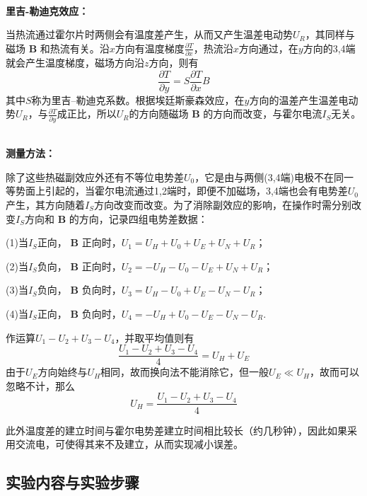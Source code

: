 \documentclass[UTF8]{article}
\theoremstyle{MyLineTheoremStyle} %
\theoremstyle{MyBlockTheoremStyle} %
\theoremstyle{MySubsubsectionStyle} %
\begin{document}
~\\
\noindent \textbf{里吉-勒迪克效应：}\par

当热流通过霍尔片时两侧会有温度差产生，从而又产生温差电动势$ U_R $，其同样与磁场 $\boldsymbol{B}$ 和热流有关。沿$ x $方向有温度梯度$ \frac{\partial T}{\partial x} $，热流沿$ x $方向通过，在$ y $方向的3,4端就会产生温度梯度，磁场方向沿$ z $方向，则有
\begin{equation}
\frac{\partial T}{\partial y}=S\frac{\partial T}{\partial x}B
\end{equation}
其中$ S $称为里吉--勒迪克系数。根据埃廷斯豪森效应，在$ y $方向的温差产生温差电动势$ U_R $，与$ \frac{\partial T}{\partial y} $成正比，所以$ U_R $的方向随磁场 $\boldsymbol{B}$ 的方向而改变，与霍尔电流$ I_S $无关。

~\\
\noindent \textbf{测量方法：}\par

除了这些热磁副效应外还有不等位电势差$ U_0 $，它是由与两侧(3,4端)电极不在同一等势面上引起的，当霍尔电流通过1,2端时，即便不加磁场，3,4端也会有电势差$ U_0 $产生，其方向随着$ I_S $方向改变而改变。为了消除副效应的影响，在操作时需分别改变$ I_S $方向和 $\boldsymbol{B}$ 的方向，记录四组电势差数据：

(1)当$ I_S $正向， $\boldsymbol{B}$ 正向时，$ U_1=U_H+U_0+U_E+U_N+U_R $；

(2)当$ I_S $负向， $\boldsymbol{B}$ 正向时，$ U_2=-U_H-U_0-U_E+U_N+U_R $；

(3)当$ I_S $负向， $\boldsymbol{B}$ 负向时，$ U_3=U_H-U_0+U_E-U_N-U_R $；

(4)当$ I_S $正向， $\boldsymbol{B}$ 负向时，$ U_4=-U_H+U_0-U_E-U_N-U_R $.

作运算$ U_1-U_2+U_3-U_4 $，并取平均值则有
\begin{equation}
\frac{U_1-U_2+U_3-U_4}{4}=U_H+U_E
\end{equation}
由于$ U_E $方向始终与$ U_H $相同，故而换向法不能消除它，但一般$ U_E\ll U_H $，故而可以忽略不计，那么
\begin{equation}
U_H=\frac{U_1-U_2+U_3-U_4}{4}
\end{equation}

此外温度差的建立时间与霍尔电势差建立时间相比较长（约几秒钟），因此如果采用交流电，可使得其来不及建立，从而实现减小误差。

\subsection{实验内容与实验步骤}
\end{document}
